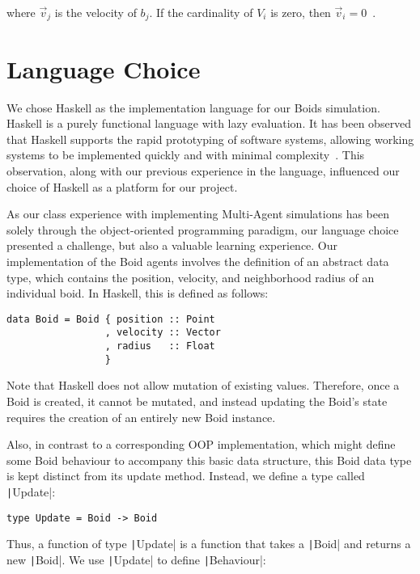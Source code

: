 where $\vec{v}_j$ is the velocity of $b_j$. If the cardinality of $V_i$ is zero, then $\vec{v}_i = 0$~\cite{hartman2006autonomous}.


\section{Language Choice}

We chose Haskell as the implementation language for our Boids simulation.
Haskell is a purely functional language with lazy evaluation. It has been observed that Haskell supports the rapid prototyping of software systems, allowing working systems to be implemented quickly and with minimal complexity~\cite{hudak1994haskell}. This observation, along with our previous experience in the language, influenced our choice of Haskell as a platform for our project.

As our class experience with implementing Multi-Agent simulations has been solely through the object-oriented programming paradigm, our language choice presented a challenge, but also a valuable learning experience. Our
implementation of the Boid agents involves the definition of an abstract data
type, which contains the position, velocity, and neighborhood radius of an
individual boid. In Haskell, this is defined as follows:

\begin{verbatim}
data Boid = Boid { position :: Point
                 , velocity :: Vector
                 , radius   :: Float
                 }
\end{verbatim}

Note that Haskell does not allow mutation of existing values. Therefore, once a
Boid is created, it cannot be mutated, and instead updating the Boid’s state
requires the creation of an entirely new Boid instance.

Also, in contrast to a corresponding OOP implementation, which might define some Boid behaviour to accompany this basic data structure, this Boid data type is kept distinct from its update method. Instead, we define a type called \texttt|Update|:

\begin{verbatim}
type Update = Boid -> Boid
\end{verbatim}

Thus, a function of type \texttt|Update| is a function that takes a \texttt|Boid| and returns
a new \texttt|Boid|. We use \texttt|Update| to define \texttt|Behaviour|:

